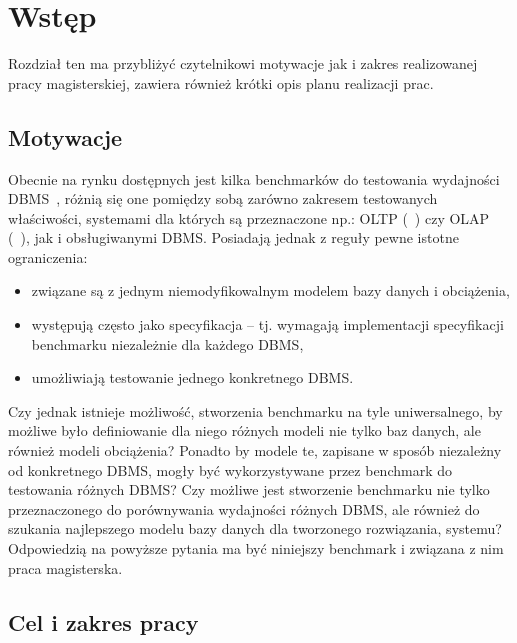 
\chapter{Wstęp}

Rozdział ten ma przybliżyć czytelnikowi motywacje jak i zakres realizowanej pracy magisterskiej, 
zawiera również krótki opis planu realizacji prac.

\section{Motywacje}\label{sect:Motywacje}

Obecnie na rynku dostępnych jest kilka benchmarków do testowania wydajności DBMS~\cite{DBMS}, 
różnią się one pomiędzy sobą zarówno zakresem testowanych właściwości, systemami dla których
są przeznaczone np.: OLTP (~\cite{OLTP}) 
czy OLAP (~\cite{OLAP}),
jak i obsługiwanymi DBMS. Posiadają jednak z reguły pewne istotne ograniczenia:
\begin{itemize}
\item związane są z jednym niemodyfikowalnym modelem bazy danych i obciążenia,
\item występują często jako specyfikacja -- tj. wymagają implementacji specyfikacji benchmarku niezależnie dla każdego DBMS,
\item umożliwiają testowanie jednego konkretnego DBMS.
\end{itemize}
Czy jednak istnieje możliwość, stworzenia benchmarku na tyle uniwersalnego,
by możliwe było definiowanie dla niego różnych modeli nie tylko baz danych,
ale również modeli obciążenia? Ponadto by modele te, zapisane w sposób niezależny
od konkretnego DBMS, mogły być wykorzystywane przez benchmark do testowania różnych DBMS?
Czy możliwe jest stworzenie benchmarku nie tylko przeznaczonego do porównywania wydajności
różnych DBMS, ale również do szukania najlepszego modelu bazy danych dla tworzonego rozwiązania, systemu?
Odpowiedzią na powyższe pytania ma być niniejszy benchmark i związana z nim praca magisterska.

\section{Cel i zakres pracy}

